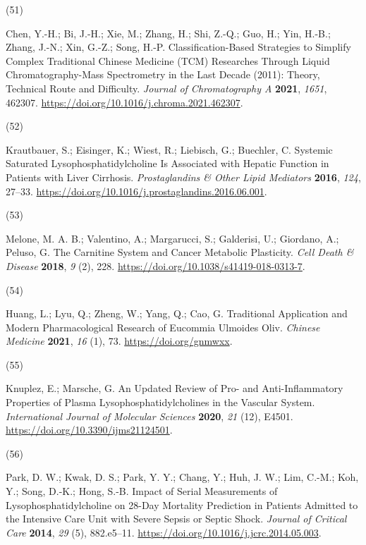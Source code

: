 \documentclass[
]{article}
\newlength{\cslhangindent}
\newlength{\csllabelwidth}
\newlength{\cslentryspacingunit} %
\newenvironment{CSLReferences}[2] %
 {%
  \setlength{\parindent}{0pt}
  \ifodd #1
  \let\oldpar\par
  \def\par{\hangindent=\cslhangindent\oldpar}
  \fi
  \setlength{\parskip}{#2\cslentryspacingunit}
 }%
 {}
\newcommand{\CSLLeftMargin}[1]{\parbox[t]{\csllabelwidth}{#1}}
\newcommand{\CSLRightInline}[1]{\parbox[t]{\linewidth - \csllabelwidth}{#1}\break}
\begin{document}
\begin{CSLReferences}{0}{0}
\leavevmode{}%
\CSLLeftMargin{(51) }%
\CSLRightInline{Chen, Y.-H.; Bi, J.-H.; Xie, M.; Zhang, H.; Shi, Z.-Q.;
Guo, H.; Yin, H.-B.; Zhang, J.-N.; Xin, G.-Z.; Song, H.-P.
Classification-Based Strategies to Simplify Complex Traditional
{Chinese} Medicine ({TCM}) Researches Through Liquid Chromatography-Mass
Spectrometry in the Last Decade (2011\textendash 2020): {Theory},
Technical Route and Difficulty. \emph{Journal of Chromatography A}
\textbf{2021}, \emph{1651}, 462307.
\url{https://doi.org/10.1016/j.chroma.2021.462307}.}

\leavevmode{}%
\CSLLeftMargin{(52) }%
\CSLRightInline{Krautbauer, S.; Eisinger, K.; Wiest, R.; Liebisch, G.;
Buechler, C. Systemic Saturated Lysophosphatidylcholine Is Associated
with Hepatic Function in Patients with Liver Cirrhosis.
\emph{Prostaglandins \& Other Lipid Mediators} \textbf{2016},
\emph{124}, 27--33.
\url{https://doi.org/10.1016/j.prostaglandins.2016.06.001}.}

\leavevmode{}%
\CSLLeftMargin{(53) }%
\CSLRightInline{Melone, M. A. B.; Valentino, A.; Margarucci, S.;
Galderisi, U.; Giordano, A.; Peluso, G. The Carnitine System and Cancer
Metabolic Plasticity. \emph{Cell Death \& Disease} \textbf{2018},
\emph{9} (2), 228. \url{https://doi.org/10.1038/s41419-018-0313-7}.}

\leavevmode{}%
\CSLLeftMargin{(54) }%
\CSLRightInline{Huang, L.; Lyu, Q.; Zheng, W.; Yang, Q.; Cao, G.
Traditional Application and Modern Pharmacological Research of
{Eucommia} Ulmoides {Oliv}. \emph{Chinese Medicine} \textbf{2021},
\emph{16} (1), 73. \url{https://doi.org/gnmwxx}.}

\leavevmode{}%
\CSLLeftMargin{(55) }%
\CSLRightInline{Knuplez, E.; Marsche, G. An {Updated Review} of {Pro-}
and {Anti-Inflammatory Properties} of {Plasma Lysophosphatidylcholines}
in the {Vascular System}. \emph{International Journal of Molecular
Sciences} \textbf{2020}, \emph{21} (12), E4501.
\url{https://doi.org/10.3390/ijms21124501}.}

\leavevmode{}%
\CSLLeftMargin{(56) }%
\CSLRightInline{Park, D. W.; Kwak, D. S.; Park, Y. Y.; Chang, Y.; Huh,
J. W.; Lim, C.-M.; Koh, Y.; Song, D.-K.; Hong, S.-B. Impact of Serial
Measurements of Lysophosphatidylcholine on 28-Day Mortality Prediction
in Patients Admitted to the Intensive Care Unit with Severe Sepsis or
Septic Shock. \emph{Journal of Critical Care} \textbf{2014}, \emph{29}
(5), 882.e5--11. \url{https://doi.org/10.1016/j.jcrc.2014.05.003}.}


\end{CSLReferences}
\end{document}
